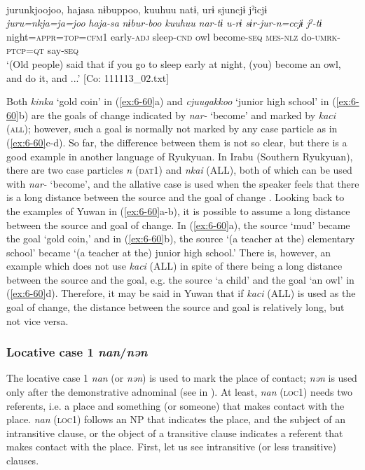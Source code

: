 \ex{}\\
{\TM}
\glll  jurunkjoojoo,  hajasa  nɨbuppoo,  kuuhuu    natɨ,  urɨ  sjuncjɨ  jˀicjɨ\\
\textit{juru=nkja=ja=joo}  \textit{haja-sa}  \textit{nɨbur-boo}  \textit{kuuhuu} \textit{nar-tɨ  u-rɨ  sɨr-jur-n=ccjɨ  jˀ-tɨ}\\
night=\textsc{appr}=\textsc{top}=\textsc{cfm}1  early-\textsc{adj}  sleep-\textsc{cnd}  owl   become-\textsc{seq}  \textsc{mes}-\textsc{nlz}  do-\textsc{umrk}-\textsc{ptcp}=\textsc{qt}  say-\textsc{seq}\\
\glt ‘(Old people) said that if you go to sleep early at night, (you) become an owl, and do it, and ...’ [Co: 111113\_02.txt]
\z
\z

Both \textit{kinka} ‘gold coin’ in (\ref{ex:6-60}a) and \textit{cjuugakkoo} ‘junior high school’ in (\ref{ex:6-60}b) are the goals of change indicated by \textit{nar-} ‘become’ and marked by \textit{kaci} (\textsc{all}); however, such a goal is normally not marked by any case particle as in (\ref{ex:6-60}c-d). So far, the difference between them is not so clear, but there is a good example in another language of Ryukyuan. In Irabu (Southern Ryukyuan), there are two case particles \textit{n} (\textsc{dat}1) and \textit{nkai} (ALL), both of which can be used with \textit{nar-} ‘become’, and the allative case is used when the speaker feels that there is a long distance between the source and the goal of change \citep{Shimoji2013}. Looking back to the examples of Yuwan in (\ref{ex:6-60}a-b), it is possible to assume a long distance between the source and goal of change. In (\ref{ex:6-60}a), the source ‘mud’ became the goal ‘gold coin,’ and in (\ref{ex:6-60}b), the source ‘(a teacher at the) elementary school’ became ‘(a teacher at the) junior high school.’ There is, however, an example which does not use \textit{kaci} (ALL) in spite of there being a long distance between the source and the goal, e.g. the source ‘a child’ and the goal ‘an owl’ in (\ref{ex:6-60}d). Therefore, it may be said in Yuwan that if \textit{kaci} (ALL) is used as the goal of change, the distance between the source and goal is relatively long, but not vice versa.

\subsubsection{Locative case 1 \textit{nan}/\textit{nən}}

The locative case 1 \textit{nan} (or \textit{nən}) is used to mark the place of contact; \textit{nən} is used only after the demonstrative adnominal (see  in ). At least, \textit{nan} (\textsc{loc1}) needs two referents, i.e. a place and something (or someone) that makes contact with the place. \textit{nan} (\textsc{loc1}) follows an NP that indicates the place, and the subject of an intransitive clause, or the object of a transitive clause indicates a referent that makes contact with the place. First, let us see intransitive (or less transitive) clauses.

